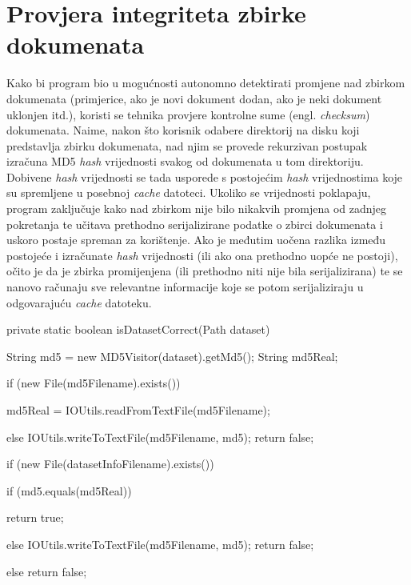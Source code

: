 \documentclass[times, utf8, zavrsni]{fer}
\begin{document}
\section{Provjera integriteta zbirke dokumenata}
Kako bi program bio u mogućnosti autonomno detektirati promjene nad zbirkom dokumenata (primjerice, ako je novi dokument dodan, ako je neki dokument uklonjen itd.), koristi se tehnika provjere kontrolne sume (engl. \textit{checksum}) dokumenata. Naime, nakon što korisnik odabere direktorij na disku koji predstavlja zbirku dokumenata, nad njim se provede rekurzivan postupak izračuna MD5 \textit{hash} vrijednosti svakog od dokumenata u tom direktoriju. Dobivene \textit{hash} vrijednosti se tada usporede s postojećim \textit{hash} vrijednostima koje su spremljene u posebnoj \textit{cache} datoteci. Ukoliko se vrijednosti poklapaju, program zaključuje kako nad zbirkom nije bilo nikakvih promjena od zadnjeg pokretanja te učitava prethodno serijalizirane podatke o zbirci dokumenata i uskoro postaje spreman za korištenje. Ako je međutim uočena razlika između postojeće i izračunate \textit{hash} vrijednosti (ili ako ona prethodno uopće ne postoji), očito je da je zbirka promijenjena (ili prethodno niti nije bila serijalizirana) te se nanovo računaju sve relevantne informacije koje se potom serijaliziraju u odgovarajuću \textit{cache} datoteku.

\begin{code}[caption={Isječak programskog koda za provjeru ispravnosti zbirke},captionpos=b]
private static boolean isDatasetCorrect(Path dataset) {
    String md5 = new MD5Visitor(dataset).getMd5();
    String md5Real;

    if (new File(md5Filename).exists()) {
        md5Real = IOUtils.readFromTextFile(md5Filename);

    } else {
        IOUtils.writeToTextFile(md5Filename, md5);
        return false;
    }

    if (new File(datasetInfoFilename).exists()) {
        if (md5.equals(md5Real)) {
            return true;

        } else {
            IOUtils.writeToTextFile(md5Filename, md5);
            return false;
        }

    } else {
        return false;
    }
}
\end{code}
\end{document}
